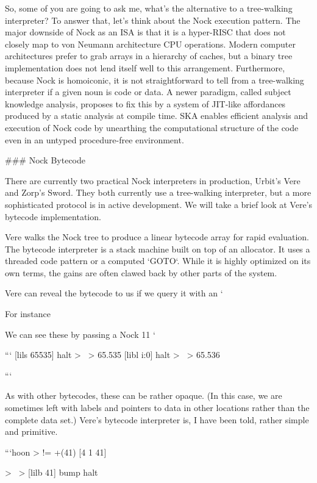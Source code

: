 \documentclass[twoside]{article}
\begin{document}
So, some of you are going to ask me, what's the alternative to a tree-walking interpreter?  To answer that, let's think about the Nock execution pattern.  The major downside of Nock as an ISA is that it is a hyper-RISC that does not closely map to von Neumann architecture CPU operations.  Modern computer architectures prefer to grab arrays in a hierarchy of caches, but a binary tree implementation does not lend itself well to this arrangement.  Furthermore, because Nock is homoiconic, it is not straightforward to tell from a tree-walking interpreter if a given noun is code or data.  A newer paradigm, called subject knowledge analysis, proposes to fix this by a system of JIT-like affordances produced by a static analysis at compile time.  SKA enables efficient analysis and execution of Nock code by unearthing the computational structure of the code even in an untyped procedure-free environment.

### Nock Bytecode

There are currently two practical Nock interpreters in production, Urbit's Vere and Zorp's Sword.  They both currently use a tree-walking interpreter, but a more sophisticated protocol is in active development.  We will take a brief look at Vere's bytecode implementation.

Vere walks the Nock tree to produce a linear bytecode array for rapid evaluation.  The bytecode interpreter is a stack machine built on top of an allocator.  It uses a threaded code pattern or a computed `GOTO`.  While it is highly optimized on its own terms, the gains are often clawed back by other parts of the system.

Vere can reveal the bytecode to us if we query it with an `%

For instance

We can see these by passing a Nock 11 `%

```
{[lils 65535] halt}
> ~>  %
65.535
{[libl i:0] halt}
> ~>  %
65.536

```

As with other bytecodes, these can be rather opaque.  (In this case, we are sometimes left with labels and pointers to data in other locations rather than the complete data set.)  Vere's bytecode interpreter is, I have been told, rather simple and primitive.

```hoon
> !=  +(41)
[4 1 41]

> ~>  %
{[lilb 41] bump halt}
\end{document}

